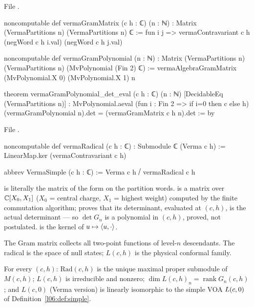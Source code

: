 File .
\begin{leancode}
noncomputable def vermaGramMatrix (c h : ℂ) (n : ℕ) :
    Matrix (VermaPartitions n) (VermaPartitions n) ℂ := fun i j =>
  vermaContravariant c h (negWord c h i.val) (negWord c h j.val)

noncomputable def vermaGramPolynomial (n : ℕ) :
    Matrix (VermaPartitions n) (VermaPartitions n) (MvPolynomial (Fin 2) ℂ) :=
  vermaAlgebraGramMatrix (MvPolynomial.X 0) (MvPolynomial.X 1) n

theorem vermaGramPolynomial_det_eval (c h : ℂ) (n : ℕ) [DecidableEq (VermaPartitions n)] :
    MvPolynomial.aeval (fun i : Fin 2 => if i=0 then c else h)
      (vermaGramPolynomial n).det = (vermaGramMatrix c h n).det := by
\end{leancode}
File .
\begin{leancode}
noncomputable def vermaRadical (c h : ℂ) : Submodule ℂ (Verma c h) :=
  LinearMap.ker (vermaContravariant c h)

abbrev VermaSimple (c h : ℂ) := Verma c h ⧸ vermaRadical c h
\end{leancode}

\begin{dictionary}
 is literally the matrix of the form on the partition words. 
 is a matrix over ${\mathbb{C}}[X_0,X_1]$ ($X_0$ = central charge, $X_1$ = highest
weight) computed by the finite commutation algorithm; \allowbreak{}\allowbreak{} proves that
its determinant, evaluated at $(c,h)$, is the actual determinant --- so $\det G_n$ is a polynomial in
$(c,h)$, proved, not postulated.  is the kernel of $u\mapsto\langle u,\cdot\rangle$.
\end{dictionary}

\begin{physics}
The Gram matrix collects all two-point functions of level-$n$ descendants. The radical is the space of
null states; $L(c,h)$ is the physical conformal family.
\end{physics}

\begin{theorem}\label{l06:thm:radical}
For every $(c,h)$: $\mathrm{Rad}(c,h)$ is the unique maximal proper submodule of $M(c,h)$; $L(c,h)$ is
irreducible and nonzero; $\dim L(c,h)_n = \operatorname{rank}G_n(c,h)$; and $L(c,0)$ (Verma version) is
linearly isomorphic to the simple VOA $L(c,0)$ of Definition~\ref{l06:def:simple}.
\end{theorem}

